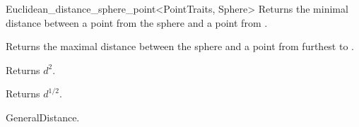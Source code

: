 \begin{ccRefClass}{Euclidean_distance_sphere_point<PointTraits, Sphere>}
{Returns the minimal distance between a point from the sphere  and a point from
.}

{Returns the maximal distance between the sphere  and
a point from  furthest to . }

 {Returns $d^2$.}

 {Returns $d^{1/2}$.}


\ccSeeAlso

GeneralDistance.



\end{ccRefClass}


